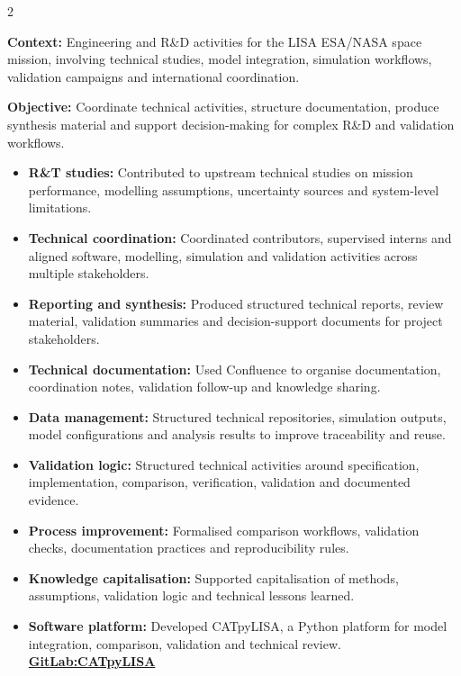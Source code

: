 \documentclass[8pt,a4paper,ragged2e,withhyper]{altacv}
\begin{document}
\begin{paracol}{2}
\divider


\textbf{Context:} Engineering and R\&D activities for the LISA ESA/NASA space mission, involving technical studies, model integration, simulation workflows, validation campaigns and international coordination.

\textbf{Objective:} Coordinate technical activities, structure documentation, produce synthesis material and support decision-making for complex R\&D and validation workflows.

\begin{itemize}
  \item \textbf{R\&T studies:} Contributed to upstream technical studies on mission performance, modelling assumptions, uncertainty sources and system-level limitations.
  \item \textbf{Technical coordination:} Coordinated contributors, supervised interns and aligned software, modelling, simulation and validation activities across multiple stakeholders.
  \item \textbf{Reporting and synthesis:} Produced structured technical reports, review material, validation summaries and decision-support documents for project stakeholders.
  \item \textbf{Technical documentation:} Used Confluence to organise documentation, coordination notes, validation follow-up and knowledge sharing.
  \item \textbf{Data management:} Structured technical repositories, simulation outputs, model configurations and analysis results to improve traceability and reuse.
  \item \textbf{Validation logic:} Structured technical activities around specification, implementation, comparison, verification, validation and documented evidence.
  \item \textbf{Process improvement:} Formalised comparison workflows, validation checks, documentation practices and reproducibility rules.
  \item \textbf{Knowledge capitalisation:} Supported capitalisation of methods, assumptions, validation logic and technical lessons learned.
  \item \textbf{Software platform:} Developed CATpyLISA, a Python platform for model integration, comparison, validation and technical review.
  \textcolor{DarkPastelRed}{\href{https://gitlab.oca.eu/gboileau/lisa_l3_tools}{\bf GitLab:CATpyLISA}}
\end{itemize}


\end{paracol}
\end{document}
